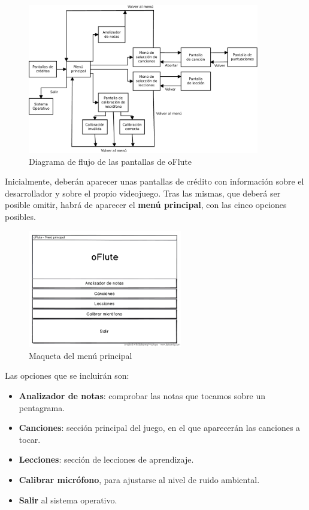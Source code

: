 \begin{figure}[h!]
  \centering
  \includegraphics[width=0.9\textwidth]{4_analisis/imagen_diagrama_de_flujo}
  \caption{Diagrama de flujo de las pantallas de oFlute}
\end{figure}

\pagebreak

Inicialmente, deberán aparecer unas pantallas de crédito con información sobre
el desarrollador y sobre el propio videojuego. Tras las mismas, que deberá ser
posible omitir, habrá de aparecer el \textbf{menú principal}, con las cinco
opciones posibles.

\begin{figure}[h!]
  \centering
  \includegraphics[width=0.6\textwidth]{4_analisis/imagen_mockup_menu_principal}
  \caption{Maqueta del menú principal}
\end{figure}

\pagebreak

Las opciones que se incluirán son:
\begin{itemize}
\item \textbf{Analizador de notas}: comprobar las notas que tocamos sobre un
  pentagrama.
\item \textbf{Canciones}: sección principal del juego, en el que aparecerán las
  canciones a tocar.
\item \textbf{Lecciones}: sección de lecciones de aprendizaje.
\item \textbf{Calibrar micrófono}, para ajustarse al nivel de ruido ambiental.
\item \textbf{Salir} al sistema operativo.
\end{itemize}

